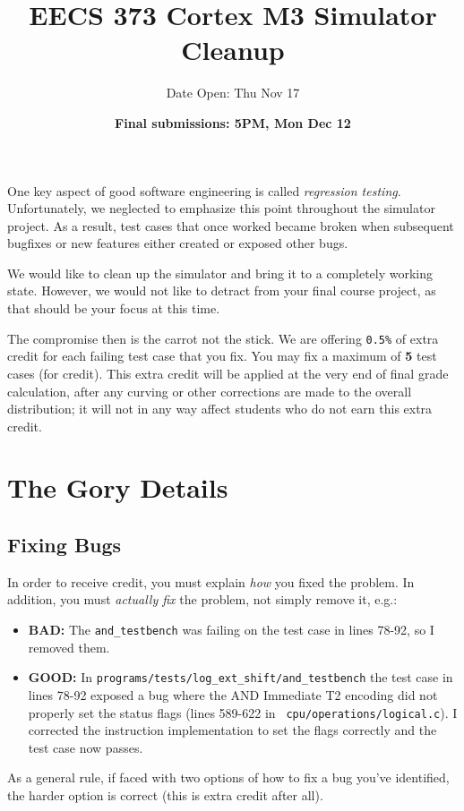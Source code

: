 \documentclass{article}
\begin{document}
\pagestyle{fancyplain}

\title{EECS 373 Cortex M3 Simulator Cleanup}
\author{Date Open: Thu Nov 17}
\date{{\bf Final submissions: 5PM, Mon Dec 12}}
\maketitle

One key aspect of good software engineering is called {\em regression
testing}. Unfortunately, we neglected to emphasize this point throughout the
simulator project. As a result, test cases that once worked became broken when
subsequent bugfixes or new features either created or exposed other bugs.

We would like to clean up the simulator and bring it to a completely working
state. However, we would not like to detract from your final course project,
as that should be your focus at this time.

The compromise then is the carrot not the stick. We are offering {\tt 0.5\%}
of extra credit for each failing test case that you fix. You may fix a maximum
of {\bf 5} test cases (for credit). This extra credit will be applied at the
very end of final grade calculation, after any curving or other corrections
are made to the overall distribution; it will not in any way affect students
who do not earn this extra credit.

\section{The Gory Details}
\subsection {Fixing Bugs}
In order to receive credit, you must explain {\em how} you fixed the problem.
In addition, you must {\em actually fix} the problem, not simply remove it,
e.g.:
\begin{itemize}
\item {\bf BAD:} The {\tt and\_testbench} was failing on the test case in
lines 78-92, so I removed them.
\item {\bf GOOD:} In {\tt programs/tests/log\_ext\_shift/and\_testbench} the
test case in lines 78-92 exposed a bug where the AND Immediate T2 encoding did
not properly set the status flags (lines 589-622 in {\tt
cpu/operations/logical.c}).  I corrected the instruction implementation to set
the flags correctly and the test case now passes.
\end{itemize}
As a general rule, if faced with two options of how to fix a bug you've
identified, the harder option is correct (this is extra credit after all).
\end{document}
